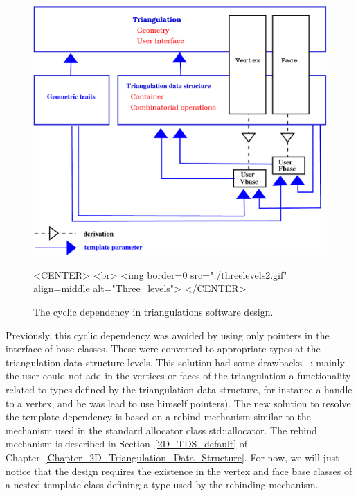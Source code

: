 \begin{figure}
\begin{ccTexOnly}
\begin{center}
\includegraphics[width=13cm]{Triangulation_2/threelevels2}
\end{center}

\end{ccTexOnly}

\begin{ccHtmlOnly}
<CENTER>
<br>
<img border=0 src="./threelevels2.gif" align=middle alt="Three_levels">
</CENTER>
\end{ccHtmlOnly}

\caption{The cyclic dependency in triangulations software design.
\label{2D_Triangulation_Fig_three_levels_2}}
\end{figure}

Previously, this cyclic dependency was avoided by 
using only  pointers in the interface of base classes.
These  were converted to appropriate types at the
triangulation data structure levels. This solution had some drawbacks
~: mainly the user could not add in the vertices or faces of the 
triangulation a functionality related to types defined by 
the triangulation data structure, for instance a handle to a vertex,
and he was lead to use himself 
  pointers).
The new solution to resolve the template dependency
is based on a rebind mechanism similar to the mechanism used in the 
standard allocator class std::allocator. The rebind mechanism
is described in Section~\ref{2D_TDS_default} 
of Chapter~\ref{Chapter_2D_Triangulation_Data_Structure}.
For now, we will just notice that the design
requires
the existence in the vertex and face base classes 
of a nested template class
 defining a type  used by
the rebinding mechanism.


